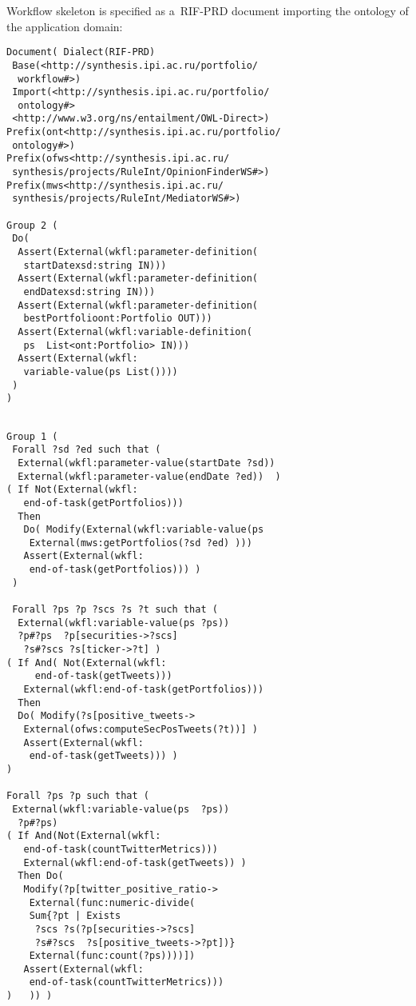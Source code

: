 \begin{multicols}{2}
{  Workflow skeleton is specified as a~RIF-PRD document importing the ontology of
the application domain:
  \begin{verbatim}
Document( Dialect(RIF-PRD)
 Base(<http://synthesis.ipi.ac.ru/portfolio/
  workflow#>)
 Import(<http://synthesis.ipi.ac.ru/portfolio/
  ontology#>
 <http://www.w3.org/ns/entailment/OWL-Direct>)
Prefix(ont<http://synthesis.ipi.ac.ru/portfolio/
 ontology#>)
Prefix(ofws<http://synthesis.ipi.ac.ru/
 synthesis/projects/RuleInt/OpinionFinderWS#>)
Prefix(mws<http://synthesis.ipi.ac.ru/
 synthesis/projects/RuleInt/MediatorWS#>)

Group 2 (
 Do(
  Assert(External(wkfl:parameter-definition(
   startDatexsd:string IN)))
  Assert(External(wkfl:parameter-definition(
   endDatexsd:string IN)))
  Assert(External(wkfl:parameter-definition(
   bestPortfolioont:Portfolio OUT)))
  Assert(External(wkfl:variable-definition(
   ps  List<ont:Portfolio> IN)))
  Assert(External(wkfl:
   variable-value(ps List())))
 )
)
\end{verbatim}

\noindent
\begin{verbatim}

Group 1 (
 Forall ?sd ?ed such that (
  External(wkfl:parameter-value(startDate ?sd))
  External(wkfl:parameter-value(endDate ?ed))  )
( If Not(External(wkfl:
   end-of-task(getPortfolios)))
  Then
   Do( Modify(External(wkfl:variable-value(ps
    External(mws:getPortfolios(?sd ?ed) )))
   Assert(External(wkfl:
    end-of-task(getPortfolios))) )
 )

 Forall ?ps ?p ?scs ?s ?t such that (
  External(wkfl:variable-value(ps ?ps))
  ?p#?ps  ?p[securities->?scs]
   ?s#?scs ?s[ticker->?t] )
( If And( Not(External(wkfl:
     end-of-task(getTweets)))
   External(wkfl:end-of-task(getPortfolios)))
  Then
  Do( Modify(?s[positive_tweets->
   External(ofws:computeSecPosTweets(?t))] )
   Assert(External(wkfl:
    end-of-task(getTweets))) )
)

Forall ?ps ?p such that (
 External(wkfl:variable-value(ps  ?ps))
  ?p#?ps)
( If And(Not(External(wkfl:
   end-of-task(countTwitterMetrics)))
   External(wkfl:end-of-task(getTweets)) )
  Then Do(
   Modify(?p[twitter_positive_ratio->
    External(func:numeric-divide(
    Sum{?pt | Exists
     ?scs ?s(?p[securities->?scs]
     ?s#?scs  ?s[positive_tweets->?pt])}
    External(func:count(?ps))))])
   Assert(External(wkfl:
    end-of-task(countTwitterMetrics)))
)	)) )
\end{verbatim}

\begin{figure*}[b] %
\vspace*{-4pt}
 \begin{center}
 \mbox{%
 \epsfxsize=162.319mm
 }
 \end{center}
 \vspace*{-9pt}
  \end{figure*}

}
\end{multicols}
